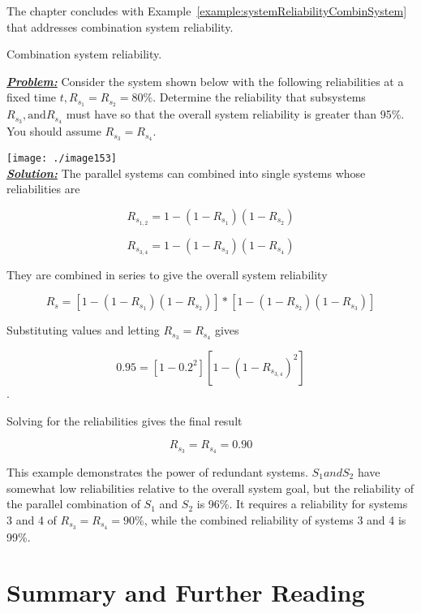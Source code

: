 {The chapter concludes with 
Example~\ref{example:systemReliabilityCombinSystem} that 
addresses combination system reliability.


\begin{example}{Combination system reliability.}
\label{example:systemReliabilityCombinSystem}

\emph{\textbf{\ul{Problem:}}} Consider the system shown below with the
following reliabilities at a fixed time $t, R_{s_1}=R_{s_2}= 80\%$. 
Determine the reliability that subsystems $R_{s_3}, \text{and} R_{s_4}$
must have so that the overall system reliability is greater than 95\%.  
You should assume $R_{s_3} = R_{s_4}$.

\texttt{[image: ./image153]}\\

\noindent\emph{\textbf{\ul{Solution:}}} The parallel systems can combined into
single systems whose reliabilities are

$$R_{s_{1,2}} = 1 - (1-R_{s_1})(1-R_{s_2}) $$

$$R_{s_{3,4}} = 1 - (1-R_{s_3})(1-R_{s_4})$$

They are combined in series to give the overall system reliability

$$R_s = \left[ 1 - (1-R_{s_1})(1-R_{s_2}) \right] * \left[ 1 - (1-R_{s_2})(1-R_{s_3}) \right]$$

Substituting values and letting $R_{s_3} = R_{s_4}$ gives

$$0.95 = \left[ 1-0.2^2 \right] \left[1 - (1-R_{s_{3,4}})^2 \right]$$.

Solving for the reliabilities gives the final result

$$R_{s_3} = R_{s_4} = 0.90$$
\end{example}

This example demonstrates the power of redundant systems.
$S_1 and S_2$ have somewhat low reliabilities
relative to the overall system goal, but the reliability of the parallel
combination of $S_1$ and $S_2$ is 96\%. It requires a
reliability for systems 3 and 4 of $R_{s_3} = R_{s_4} = 90\%$, while the combined
reliability of systems 3 and 4 is 99\%.

\section{Summary and Further Reading}
\label{section:summary-and-further-reading}

}
